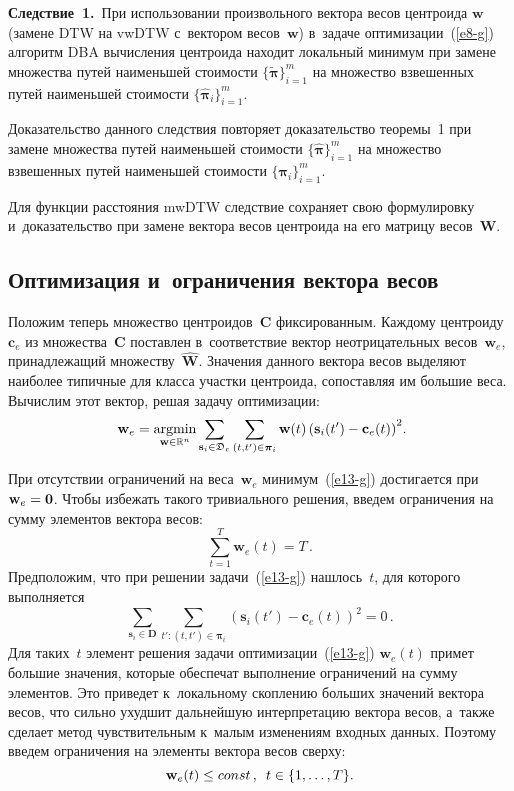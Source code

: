 \begin{multicols}{2}
\noindent
\textbf{Следствие~1.}\
При использовании произвольного вектора весов центроида $\mathbf{w}$ (замене DTW 
на \mbox{vwDTW} с~вектором весов~$\mathbf{w}$) в~задаче оптимизации~(\ref{e8-g})\linebreak 
алгоритм DBA вычисления центроида находит локальный минимум при замене 
множества путей наименьшей стоимости $\{\boldsymbol{\tilde{\pi}}\}_{i=1}^m$ на 
множество взвешенных путей наименьшей стоимости 
$\{\boldsymbol{\hat{\pi}}_i\}_{i=1}^m$.

\smallskip

Доказательство данного следствия повторяет доказательство теоремы~1 
при замене множества путей наименьшей стоимости $\{\boldsymbol{\hat{\pi}}\}_{i=1}^m$ 
на множество взвешенных путей наименьшей стоимости $\{\boldsymbol{\pi}_i\}_{i=1}^m$.

Для функции расстояния mwDTW следствие сохраняет свою формулировку и~доказательство 
при замене вектора весов центроида на его матрицу весов~$\mathbf{W}$.


\subsection{Оптимизация и~ограничения вектора весов}

Положим теперь множество центроидов~$\mathbf{C}$ фиксированным. Каждому 
центроиду~$\mathbf{c}_e$ из множества~$\mathbf{C}$ поставлен в~соответствие 
вектор неотрицательных весов~$\mathbf{w}_e$, принадлежащий множеству~$\hat{\mathbf{W}}$. 
Значения данного вектора весов выделяют наиболее типичные для класса участки центроида, 
сопоставляя им большие веса. Вычислим этот вектор, решая задачу оптимизации:
\begin{equation}
\mathbf{w}_e = \mathop{\mathrm{argmin}}\limits_{{\mathbf{w} \in 
 \mathbb{R}^n}}\sum\limits_{\mathbf{s}_i \in \mathfrak{D}_e}
 {\sum\limits_{(t,t') \in \boldsymbol{\pi}_i}\mathbf{w}(t)
 \left(\mathbf{s}_i(t')-\mathbf{c}_e(t)\right)^2}.\!\!
 \label{e13-g}
 \end{equation}


При отсутствии ограничений на веса~$\mathbf{w}_e$ минимум~(\ref{e13-g}) 
достигается при $\mathbf{w}_e \hm= \boldsymbol{0}$. Чтобы избежать 
такого тривиального решения, введем ограничения на сумму элементов вектора весов:
 $$
 \sum\limits_{t=1}^T{\mathbf{w}_e(t)} = T\,.
 $$
 Предположим, что при решении задачи~(\ref{e13-g}) нашлось~$t$, 
 для которого выполняется
$$
\sum\limits_{\mathbf{s}_i \in \mathbf{D}}
\sum\limits_{t' : (t,t') \in \boldsymbol{\pi}_i}
\left(\mathbf{s}_i(t')-\mathbf{c}_e(t)\right)^2 = 0\,.
$$
Для таких~$t$ элемент решения задачи оптимизации~(\ref{e13-g}) 
$\mathbf{w}_e(t)$ примет большие значения, которые обеспечат выполнение ограничений 
на сумму элементов. Это приведет к~локальному скоплению больших значений вектора 
весов, что сильно ухудшит дальнейшую интерпретацию вектора весов, а~также сделает 
метод чувствительным к~малым изменениям входных данных. Поэтому введем ограничения 
на элементы вектора весов сверху:
$$
\mathbf{w}_e(t) \leq const\,,\enskip t \in \{1,\ldots ,T\}.
$$


\end{multicols}
